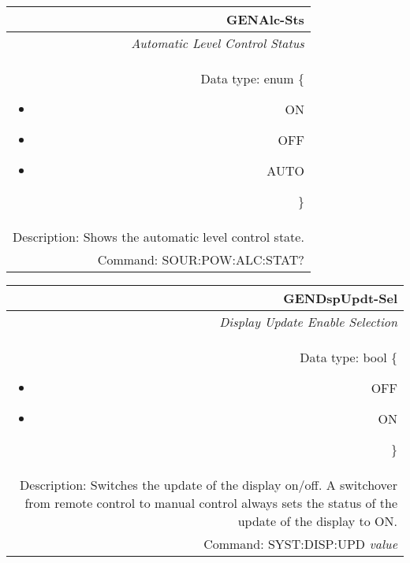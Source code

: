 \documentclass[openany]{article}
\begin{document}
		\begin{tabular}{N}
			\hline
			\bfseries GENAlc-Sts \\ \hline
			\emph{Automatic Level Control Status} \\
			Data type: enum \{\begin{itemize}[noitemsep]
				\small
				\item[] ON
				\item[] OFF
				\item[] AUTO
			\end{itemize}\} \\
			Description: Shows the automatic level control state. \\
			Command: SOUR:POW:ALC:STAT? \\

		\end{tabular}
%
		\begin{tabular}{N}
			\hline
			\bfseries GENDspUpdt-Sel \\ \hline
			\emph{Display Update Enable Selection} \\
			Data type: bool \{\begin{itemize}[noitemsep]
				\small
				\item[] OFF
				\item[] ON
			\end{itemize}\} \\
			Description: Switches the update of the display on/off. A switchover from remote control to manual control always sets the status of the update of the display to ON. \\
			Command: SYST:DISP:UPD \emph{value} \\

		\end{tabular}
\end{document}
